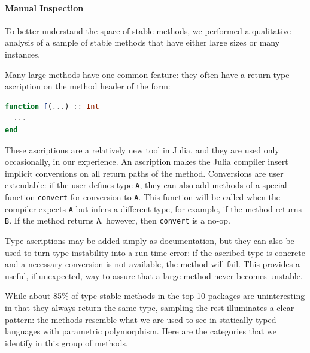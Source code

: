 \documentclass[oneside,openright,titlepage,numbers=noenddot,%
headinclude,footinclude,cleardoublepage=empty,abstract=on,
BCOR=5mm,paper=a4,fontsize=11pt,
dvipsnames
]{scrreprt}
\renewcommand{\c}[1]{\lstinline[language=Julia]!#1!\xspace}
\begin{document}
\paragraph{Manual Inspection}

To better understand the space of stable methods,
we performed a qualitative analysis of a sample of stable methods that
have either large sizes or many instances.

Many large methods have one common
feature: they often have a return type ascription on the method header of
the form:
\begin{lstlisting}[language=julia]
function f(...) :: Int
  ...
end
\end{lstlisting}
These ascriptions are a relatively new tool in Julia, and they are used only
occasionally, in our experience. An ascription makes the Julia compiler insert implicit
conversions on all return paths of the method. Conversions are user extendable:
if the user defines type \c{A}, they can also add methods of a special
function \c{convert} for conversion to \c{A}. This function will be called
when the compiler expects \c{A} but infers a different type, for example,
if the method returns \c{B}.
If the method returns \c{A}, however, then \c{convert} is a no-op.

Type ascriptions may be added simply as documentation, but they can also
be used to turn type instability into a run-time error:
if the ascribed type is concrete and a necessary conversion is not available,
the method will fail. This provides a useful, if
unexpected, way to assure that a large method never becomes unstable.

While about 85\% of type-stable methods in the top 10 packages are uninteresting
in that they always return the same type, sampling the rest illuminates
a clear pattern: the methods resemble what we
are used to see in statically typed languages with parametric polymorphism.
Here are the categories that we identify in this group of methods.
\end{document}
